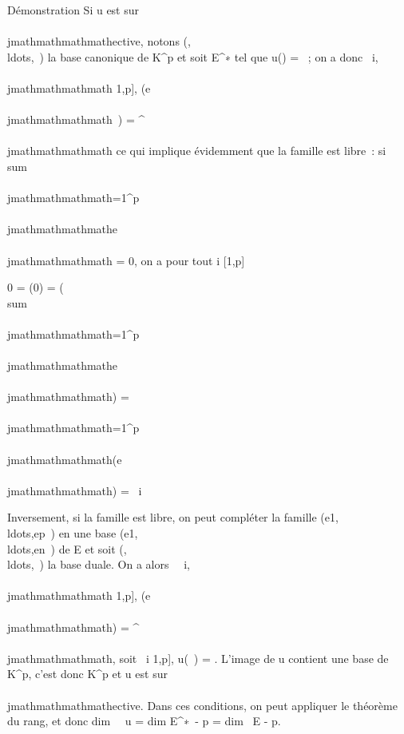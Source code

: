 Démonstration Si u est sur\\\\jmathmathmathmathective, notons
(,\\ldots,\epsilonp~)
la base canonique de K^p et soit \phii \in
E^∗ tel que u(\phii) = \epsiloni~; on a donc
\forall~i,\\\\jmathmathmathmath \in {[}1,p{]}, \phii(e\\\\jmathmathmathmath~) =
\deltai^\\\\jmathmathmathmath ce qui implique évidemment que la famille est
libre~: si \\sum ~
\\\\jmathmathmathmath=1^p\lambda~\\\\jmathmathmathmathe\\\\jmathmathmathmath = 0, on a pour tout i \in
{[}1,p{]}

0 = \phii(0) = \phii(\\sum
\\\\jmathmathmathmath=1^p\lambda~ \\\\jmathmathmathmathe\\\\jmathmathmathmath) =
\sum \\\\jmathmathmathmath=1^p\lambda~~
\\\\jmathmathmathmath\phii(e\\\\jmathmathmathmath) = \lambda~i

Inversement, si la famille est libre, on peut compléter la famille
(e1,\\ldots,ep~)
en une base
(e1,\\ldots,en~)
de E et soit
(,\\ldots,\phin~)
la base duale. On a alors \forall~~i,\\\\jmathmathmathmath \in {[}1,p{]},
\phii(e\\\\jmathmathmathmath) = \deltai^\\\\jmathmathmathmath, soit
\forall~i \in {[}1,p{]}, u(\phii~) =
\epsiloni. L'image de u contient une base de K^p, c'est
donc K^p et u est sur\\\\jmathmathmathmathective. Dans ces conditions, on peut
appliquer le théorème du rang, et donc dim~
\mathrmKer~u
= dim E^∗~- p
= dim~ E - p.

